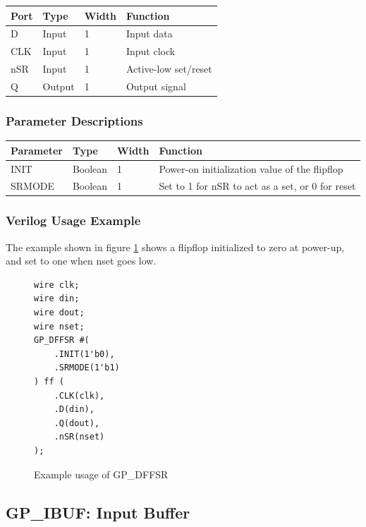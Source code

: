 \documentclass{article}
\begin{document}
\begin{tabularx}{4in}{|l|l|l|X|}
\hline
{\bfseries Port} & {\bfseries Type} & {\bfseries Width} & {\bfseries Function} \\
\hline
D & Input & 1 & Input data \\
\hline
CLK & Input & 1 & Input clock \\
\hline
nSR & Input & 1 & Active-low set/reset \\
\hline
Q & Output & 1 & Output signal \\
\hline
\end{tabularx}

\subsubsection{Parameter Descriptions}

\begin{tabularx}{5in}{|l|l|l|X|}
\hline
{\bfseries Parameter} & {\bfseries Type} & {\bfseries Width} & {\bfseries Function} \\
\hline
INIT & Boolean & 1 & Power-on initialization value of the flipflop \\
\hline
SRMODE & Boolean & 1 & Set to 1 for nSR to act as a set, or 0 for reset \\
\hline
\end{tabularx}

\subsubsection{Verilog Usage Example}

The example shown in figure \ref{gp-dffsr-example} shows a flipflop initialized to zero at power-up, and set to one
when nset goes low.

\begin{figure}[h]
\begin{lstlisting}
wire clk;
wire din;
wire dout;
wire nset;
GP_DFFSR #(
	.INIT(1'b0),
	.SRMODE(1'b1)
) ff (
	.CLK(clk),
	.D(din),
	.Q(dout),
	.nSR(nset)
);
\end{lstlisting}
\caption{Example usage of GP\_DFFSR}
\label{gp-dffsr-example}
\end{figure}


\pagebreak
\subsection{GP\_IBUF: Input Buffer}
\end{document}
